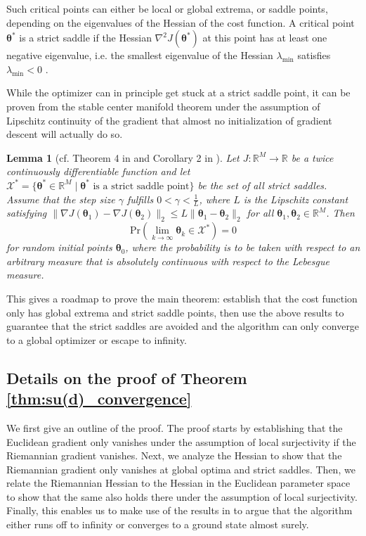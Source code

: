 \documentclass{article}
\renewcommand{\vec}[1]{\ensuremath{\boldsymbol{#1}}}
\newtheorem{lemma}{Lemma}
\begin{document}
Such critical points can either be local or global extrema, or saddle points, depending on the eigenvalues of the Hessian of the cost function.
A critical point \(\vec{\theta}^*\) is a strict saddle if the Hessian \(\nabla^2 J(\vec{\theta}^*)\) at this point has at least one negative eigenvalue, i.e. the smallest eigenvalue of the Hessian \(\lambda_\text{min}\) satisfies \(\lambda_\text{min} < 0\) \cite{lee_first-order_2019}.

While the optimizer can in principle get stuck at a strict saddle point, it can be proven from the stable center manifold theorem under the assumption of Lipschitz continuity of the gradient that almost no initialization of gradient descent will actually do so.

\begin{lemma}[cf. Theorem 4 in \cite{pmlr-v49-lee16} and Corollary 2 in \cite{lee_first-order_2019}]
    \label{lem:strict_saddles_are_avoided}
    Let \(J:\mathds{R}^M\to\mathds{R}\) be a twice continuously differentiable function and let \(\mathcal{X}^* = \{ \vec{\theta}^* \in \mathds{R}^M \mid \vec{\theta}^* \text{ is a strict saddle point}\}\) be the set of all strict saddles. Assume that the step size \(\gamma\) fulfills \(0 < \gamma < \frac{1}{L}\), where \(L\) is the Lipschitz constant satisfying \(\lVert \nabla J (\vec{\theta}_1) - \nabla J (\vec{\theta}_2) \rVert_2 \leq L \lVert \vec{\theta}_1 - \vec{\theta}_2 \rVert_2\) for all \(\vec{\theta}_1, \vec{\theta}_2 \in \mathds{R}^M\). Then
    \begin{equation}
        \mathrm{Pr}(\lim_{k \rightarrow \infty} \vec{\theta}_k \in \mathcal{X}^*) = 0
    \end{equation}
    for random initial points \(\vec{\theta}_0\), where the probability is to be taken with respect to an arbitrary measure that is absolutely continuous with respect to the Lebesgue measure.
\end{lemma}

This gives a roadmap to prove the main theorem: establish that the cost function only has global extrema and strict saddle points, then use the above results to guarantee that the strict saddles are avoided and the algorithm can only converge to a global optimizer or escape to infinity.

\subsection{Details on the proof of Theorem \ref{thm:su(d)_convergence}}
\label{sec:proof}
We first give an outline of the proof.
The proof starts by establishing that the Euclidean gradient only vanishes under the assumption of local surjectivity if the Riemannian gradient vanishes.
Next, we analyze the Hessian to show that the Riemannian gradient only vanishes at global optima and strict saddles.
Then, we relate the Riemannian Hessian to the Hessian in the Euclidean parameter space to show that the same also holds there under the assumption of local surjectivity. 
Finally, this enables us to make use of the results in  to argue that the algorithm either runs off to infinity or converges to a ground state almost surely.
\end{document}
